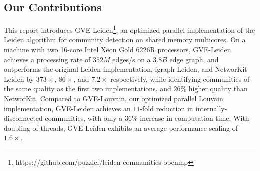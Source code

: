 \subsection{Our Contributions}

This report introduces GVE-Leiden\footnote{https://github.com/puzzlef/leiden-communities-openmp}, an optimized parallel implementation of the Leiden algorithm for community detection on shared memory multicores. On a machine with two 16-core Intel Xeon Gold 6226R processors, GVE-Leiden achieves a processing rate of $352 M$ edges/s on a $3.8 B$ edge graph, and outperforms the original Leiden implementation, igraph Leiden, and NetworKit Leiden by $373\times$, $86\times$, and $7.2\times$ respectively, while identifying communities of the same quality as the first two implementations, and $26\%$ higher quality than NetworKit. Compared to GVE-Louvain, our optimized parallel Louvain implementation, GVE-Leiden achieves an $11$-fold reduction in internally-disconnected communities, with only a $36\%$ increase in computation time. With doubling of threads, GVE-Leiden exhibits an average performance scaling of $1.6\times$.








